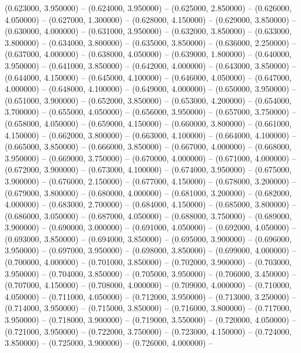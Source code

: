 (0.623000, 3.950000) -- 
(0.624000, 3.950000) -- 
(0.625000, 2.850000) -- 
(0.626000, 4.050000) -- 
(0.627000, 1.300000) -- 
(0.628000, 4.150000) -- 
(0.629000, 3.850000) -- 
(0.630000, 4.000000) -- 
(0.631000, 3.950000) -- 
(0.632000, 3.850000) -- 
(0.633000, 3.800000) -- 
(0.634000, 3.800000) -- 
(0.635000, 3.850000) -- 
(0.636000, 2.250000) -- 
(0.637000, 4.000000) -- 
(0.638000, 4.050000) -- 
(0.639000, 1.800000) -- 
(0.640000, 3.950000) -- 
(0.641000, 3.850000) -- 
(0.642000, 4.000000) -- 
(0.643000, 3.850000) -- 
(0.644000, 4.150000) -- 
(0.645000, 4.100000) -- 
(0.646000, 4.050000) -- 
(0.647000, 4.000000) -- 
(0.648000, 4.100000) -- 
(0.649000, 4.000000) -- 
(0.650000, 3.950000) -- 
(0.651000, 3.900000) -- 
(0.652000, 3.850000) -- 
(0.653000, 4.200000) -- 
(0.654000, 3.700000) -- 
(0.655000, 4.050000) -- 
(0.656000, 3.950000) -- 
(0.657000, 3.750000) -- 
(0.658000, 4.050000) -- 
(0.659000, 4.150000) -- 
(0.660000, 3.800000) -- 
(0.661000, 4.150000) -- 
(0.662000, 3.800000) -- 
(0.663000, 4.100000) -- 
(0.664000, 4.100000) -- 
(0.665000, 3.850000) -- 
(0.666000, 3.850000) -- 
(0.667000, 4.000000) -- 
(0.668000, 3.950000) -- 
(0.669000, 3.750000) -- 
(0.670000, 4.000000) -- 
(0.671000, 4.000000) -- 
(0.672000, 3.900000) -- 
(0.673000, 4.100000) -- 
(0.674000, 3.950000) -- 
(0.675000, 3.900000) -- 
(0.676000, 2.150000) -- 
(0.677000, 4.150000) -- 
(0.678000, 3.200000) -- 
(0.679000, 3.800000) -- 
(0.680000, 4.000000) -- 
(0.681000, 3.200000) -- 
(0.682000, 4.000000) -- 
(0.683000, 2.700000) -- 
(0.684000, 4.150000) -- 
(0.685000, 3.800000) -- 
(0.686000, 3.050000) -- 
(0.687000, 4.050000) -- 
(0.688000, 3.750000) -- 
(0.689000, 3.900000) -- 
(0.690000, 3.000000) -- 
(0.691000, 4.050000) -- 
(0.692000, 4.050000) -- 
(0.693000, 3.850000) -- 
(0.694000, 3.850000) -- 
(0.695000, 3.900000) -- 
(0.696000, 3.950000) -- 
(0.697000, 3.950000) -- 
(0.698000, 3.850000) -- 
(0.699000, 4.000000) -- 
(0.700000, 4.000000) -- 
(0.701000, 3.850000) -- 
(0.702000, 3.900000) -- 
(0.703000, 3.950000) -- 
(0.704000, 3.850000) -- 
(0.705000, 3.950000) -- 
(0.706000, 3.450000) -- 
(0.707000, 4.150000) -- 
(0.708000, 4.000000) -- 
(0.709000, 4.000000) -- 
(0.710000, 4.050000) -- 
(0.711000, 4.050000) -- 
(0.712000, 3.950000) -- 
(0.713000, 3.250000) -- 
(0.714000, 3.950000) -- 
(0.715000, 3.850000) -- 
(0.716000, 3.800000) -- 
(0.717000, 3.950000) -- 
(0.718000, 3.900000) -- 
(0.719000, 3.550000) -- 
(0.720000, 4.050000) -- 
(0.721000, 3.950000) -- 
(0.722000, 3.750000) -- 
(0.723000, 4.150000) -- 
(0.724000, 3.850000) -- 
(0.725000, 3.900000) -- 
(0.726000, 4.000000) -- 
